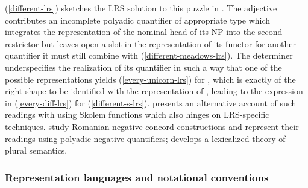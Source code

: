 \documentclass[output=paper
	        ,collection
	        ,collectionchapter
 	        ,biblatex
                ,babelshorthands
                ,newtxmath
                ,draftmode
                ,colorlinks, citecolor=brown
]{langscibook}
\begin{document}
(\ref{different-lrs}) sketches the LRS solution to this puzzle in
\citet{Richter2016}. The
adjective  contributes an incomplete polyadic
quantifier of appropriate type which integrates the representation of
the nominal head of its NP into the second restrictor but leaves open
a slot in the representation of its functor for another quantifier it
must still combine with (\ref{different-meadows-lrs}). The determiner
 underspecifies the realization of its quantifier in such
a way that one of the possible representations yields
(\ref{every-unicorn-lrs}) for , which is exactly
of the right shape to be identified with the representation of
, leading to the expression in
(\ref{every-diff-lrs}) for (\ref{different-s-lrs}).
\citet{Lahm2016b} presents an alternative account of such readings
with  using Skolem functions which also hinges on
LRS-specific techniques. \citet{IordachioaiaandRichter2015} study Romanian
negative concord constructions and represent their readings using polyadic negative
quantifiers; \citet{Lahm2018} develops a lexicalized theory
of plural semantics.




\subsubsection{Representation languages and notational conventions}
\end{document}
